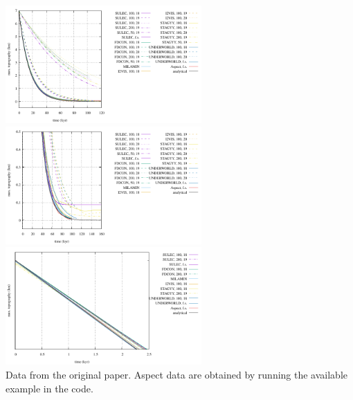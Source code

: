 \begin{center}
\includegraphics[width=7.5cm]{images/benchmark_crsg12/topo.pdf}
\includegraphics[width=7.5cm]{images/benchmark_crsg12/topozoom.pdf}\\
\includegraphics[width=7.5cm]{images/benchmark_crsg12/topozoom2.pdf}\\
{\captionfont Data from the original paper. Aspect data are obtained by running the available example in the code. }
\end{center}
